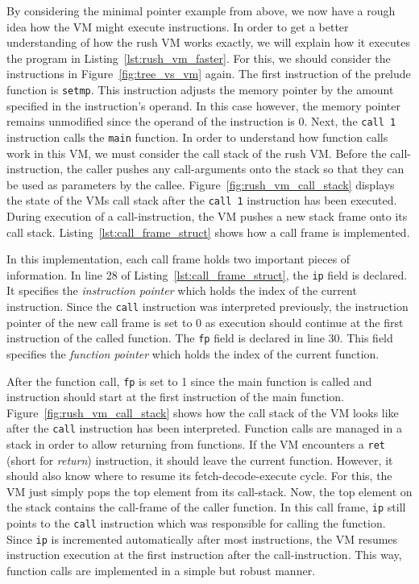 By considering the minimal pointer example from above, we now have a rough idea how the VM might execute instructions.
In order to get a better understanding of how the rush VM works exactly, we will explain how it executes the program in Listing~\ref{lst:rush_vm_faster}.
For this, we should consider the instructions in Figure~\ref{fig:tree_vs_vm} again.
The first instruction of the prelude function is \texttt{setmp}.
This instruction adjusts the memory pointer by the amount specified in the instruction's operand.
In this case however, the memory pointer remains unmodified since the operand of the instruction is 0.
Next, the \texttt{call 1} instruction calls the \texttt{main} function.
In order to understand how function calls work in this VM, we must consider the call stack of the rush VM.
Before the call-instruction, the caller pushes any call-arguments onto the stack so that they can be used as parameters by the callee.
Figure~\ref{fig:rush_vm_call_stack} displays the state of the VMs call stack after the \texttt{call 1} instruction has been executed.
During execution of a call-instruction, the VM pushes a new stack frame onto its call stack.
Listing~\ref{lst:call_frame_struct} shows how a call frame is implemented.


In this implementation, each call frame holds two important pieces of information.
In line 28 of Listing~\ref{lst:call_frame_struct}, the \texttt{ip} field is declared.
It specifies the \emph{instruction pointer} which holds the index of the current instruction.
Since the \texttt{call} instruction was interpreted previously, the instruction pointer of the new call frame is set to 0 as execution should continue at the first instruction of the called function.
The \texttt{fp} field is declared in line 30.
This field specifies the \emph{function pointer} which holds the index of the current function.

After the function call, \texttt{fp} is set to 1 since the main function is called and instruction should start at the first instruction of the main function.
Figure~\ref{fig:rush_vm_call_stack} shows how the call stack of the VM looks like after the \texttt{call} instruction has been interpreted.
Function calls are managed in a stack in order to allow returning from functions.
If the VM encounters a \texttt{ret} (short for \emph{return}) instruction, it should leave the current function.
However, it should also know where to resume its fetch-decode-execute cycle.
For this, the VM just simply pops the top element from its call-stack.
Now, the top element on the stack contains the call-frame of the caller function.
In this call frame, \texttt{ip} still points to the \texttt{call} instruction which was responsible for calling the function.
Since \texttt{ip} is incremented automatically after most instructions, the VM resumes instruction execution at the first instruction after the call-instruction.
This way, function calls are implemented in a simple but robust manner.

